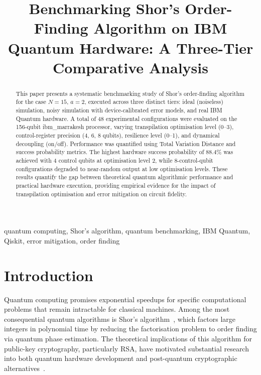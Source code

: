 \documentclass[conference]{IEEEtran}
\begin{document}
\title{Benchmarking Shor's Order-Finding Algorithm on IBM Quantum Hardware: A Three-Tier Comparative Analysis}

\author{
}

\maketitle

\begin{abstract}
This paper presents a systematic benchmarking study of Shor's order-finding algorithm for the case $N=15$, $a=2$, executed across three distinct tiers: ideal (noiseless) simulation, noisy simulation with device-calibrated error models, and real IBM Quantum hardware. A total of 48 experimental configurations were evaluated on the 156-qubit ibm\_marrakesh processor, varying transpilation optimisation level (0--3), control-register precision (4, 6, 8 qubits), resilience level (0--1), and dynamical decoupling (on/off). Performance was quantified using Total Variation Distance and success probability metrics. The highest hardware success probability of 88.4\% was achieved with 4 control qubits at optimisation level 2, while 8-control-qubit configurations degraded to near-random output at low optimisation levels. These results quantify the gap between theoretical quantum algorithmic performance and practical hardware execution, providing empirical evidence for the impact of transpilation optimisation and error mitigation on circuit fidelity.
\end{abstract}

\begin{IEEEkeywords}
quantum computing, Shor's algorithm, quantum benchmarking, IBM Quantum, Qiskit, error mitigation, order finding
\end{IEEEkeywords}

\section{Introduction}

Quantum computing promises exponential speedups for specific computational problems that remain intractable for classical machines. Among the most consequential quantum algorithms is Shor's algorithm~\cite{b1}, which factors large integers in polynomial time by reducing the factorisation problem to order finding via quantum phase estimation. The theoretical implications of this algorithm for public-key cryptography, particularly RSA, have motivated substantial research into both quantum hardware development and post-quantum cryptographic alternatives~\cite{b2}.
\end{document}
